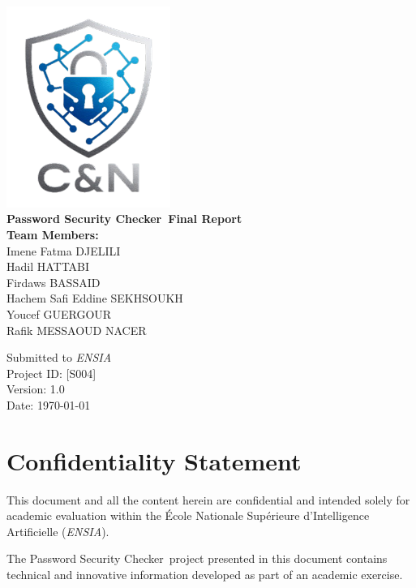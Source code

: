 \documentclass[11pt,oneside,a4paper]{book}
\newcommand{\extensionname}{Password Security Checker}
\newcommand{\esia}{\textit{ENSIA}}
\begin{document}
\begin{titlepage}
  \centering
  \vspace*{3cm}
  \includegraphics[width=0.4\textwidth]{logo.png}\\[1.5em]
  {\Huge\bfseries\color{ChapterColor}\extensionname\ Final Report}\\[3em]

  {\bfseries Team Members:}\\[0.5em]
  Imene Fatma DJELILI\\[0.05em]
  Hadil HATTABI\\[0.05em]
  Firdaws BASSAID\\[0.05em]
  Hachem Safi Eddine SEKHSOUKH\\[0.05em]
  Youcef GUERGOUR\\[0.05em]
  Rafik MESSAOUD NACER\\[4em]

  \vfill

  {\Large Submitted to \esia}\\[0.5em]
  {\normalsize Project ID: [S004]}\\[1em]
  {\normalsize Version: 1.0}\\[0.5em]
  {\normalsize Date: \today}
\end{titlepage}

\frontmatter
\tableofcontents
\newpage

\chapter*{Confidentiality Statement}
This document and all the content herein are confidential and intended solely for academic evaluation within the École Nationale Supérieure d'Intelligence Artificielle (\esia).

The \extensionname\ project presented in this document contains technical and innovative information developed as part of an academic exercise.
\end{document}

